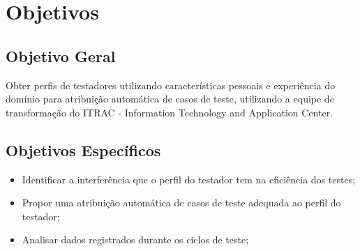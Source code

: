 \section{Objetivos}
\subsection{Objetivo Geral}

Obter perfis de testadores utilizando características pessoais e experiência do domínio para atribuição automática de casos de teste, utilizando a equipe de transformação do ITRAC - Information Technology and Application Center.

\subsection{Objetivos Específicos}

\begin{itemize}
		\item Identificar a interferência que o perfil do testador tem na eficiência dos testes;
		\item Propor uma atribuição automática de casos de teste adequada ao perfil do testador; 
		\item Analisar dados registrados durante os ciclos de teste;
	\end{itemize}

